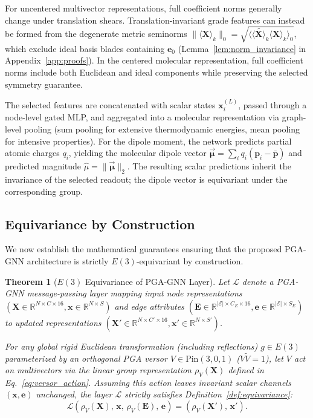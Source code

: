 \documentclass[10pt]{article}
\newtheorem{theorem}{Theorem}
\begin{document}
For uncentered multivector representations, full coefficient norms generally change under translation shears. Translation-invariant grade features can instead be formed from the degenerate metric seminorms $\|\langle\mathbf{X}\rangle_k\|_0 = \sqrt{\langle\widetilde{\langle\mathbf{X}\rangle_k}\langle\mathbf{X}\rangle_k\rangle_0}$, which exclude ideal basis blades containing $\mathbf{e}_0$ (Lemma~\ref{lem:norm_invariance} in Appendix~\ref{app:proofs}). In the centered molecular representation, full coefficient norms include both Euclidean and ideal components while preserving the selected symmetry guarantee.

The selected features are concatenated with scalar states $\mathbf{x}_i^{(L)}$, passed through a node-level gated MLP, and aggregated into a molecular representation via graph-level pooling (sum pooling for extensive thermodynamic energies, mean pooling for intensive properties). For the dipole moment, the network predicts partial atomic charges $q_i$, yielding the molecular dipole vector $\vec{\boldsymbol{\mu}} = \sum_i q_i (\mathbf{p}_i - \bar{\mathbf{p}})$ and predicted magnitude $\hat{\mu} = \|\vec{\boldsymbol{\mu}}\|_2$. The resulting scalar predictions inherit the invariance of the selected readout; the dipole vector is equivariant under the corresponding group.

\subsection{Equivariance by Construction}
\label{subsec:equiv}

We now establish the mathematical guarantees ensuring that the proposed PGA-GNN architecture is strictly $E(3)$-equivariant by construction.

\begin{theorem}[$E(3)$ Equivariance of PGA-GNN Layer]
\label{thm:equivariance}
Let $\mathcal{L}$ denote a PGA-GNN message-passing layer mapping input node representations $(\mathbf{X} \in \mathbb{R}^{N \times C \times 16}, \mathbf{x} \in \mathbb{R}^{N \times S})$ and edge attributes $(\mathbf{E} \in \mathbb{R}^{|\mathcal{E}| \times C_E \times 16}, \mathbf{e} \in \mathbb{R}^{|\mathcal{E}| \times S_E})$ to updated representations $(\mathbf{X}' \in \mathbb{R}^{N \times C' \times 16}, \mathbf{x}' \in \mathbb{R}^{N \times S'})$. 

For any global rigid Euclidean transformation (including reflections) $g \in E(3)$ parameterized by an orthogonal PGA versor $V \in \mathrm{Pin}(3,0,1)$ ($V\widetilde{V} = 1$), let $V$ act on multivectors via the linear group representation $\rho_V(\mathbf{X})$ defined in Eq.~\ref{eq:versor_action}. Assuming this action leaves invariant scalar channels $(\mathbf{x}, \mathbf{e})$ unchanged, the layer $\mathcal{L}$ strictly satisfies Definition~\ref{def:equivariance}:
\begin{equation}
    \mathcal{L}\left(\rho_V(\mathbf{X}),\, \mathbf{x},\, \rho_V(\mathbf{E}),\, \mathbf{e}\right) = \left(\rho_V(\mathbf{X}'),\, \mathbf{x}'\right).
\end{equation}
\end{theorem}
\end{document}
